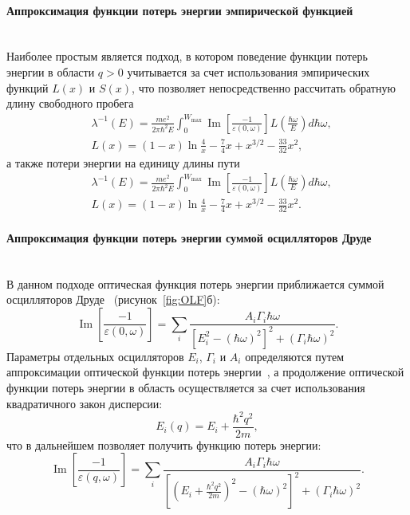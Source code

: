 \paragraph{Аппроксимация функции потерь энергии эмпирической функцией} \mbox{} \\
\indent Наиболее простым является подход, в котором поведение функции потерь энергии в области $q > 0$ учитывается за счет использования эмпирических функций $L(x)$ и $S(x)$, что позволяет непосредственно рассчитать обратную длину свободного пробега~\cite{Ashley_LxSx}
\begin{equation}
	\begin{aligned}
		&\lambda^{-1}(E)=\frac{m e^2}{2 \pi \hbar^2 E} \int_0^{W_{\max }} \operatorname{Im}\left[\frac{-1}{\varepsilon(0, \omega)}\right] L\left(\frac{\hbar \omega}{E}\right) d \hbar \omega, \\
		&L(x)=(1-x) \ln \frac{4}{x}-\frac{7}{4} x+x^{3 / 2}-\frac{33}{32} x^2,
	\end{aligned}
\end{equation}
а также потери энергии на единицу длины пути
\begin{equation}
	\begin{aligned}
		&\lambda^{-1}(E)=\frac{m e^2}{2 \pi \hbar^2 E} \int_0^{W_{\max }} \operatorname{Im}\left[\frac{-1}{\varepsilon(0, \omega)}\right] L\left(\frac{\hbar \omega}{E}\right) d \hbar \omega, \\
		&L(x)=(1-x) \ln \frac{4}{x}-\frac{7}{4} x+x^{3 / 2}-\frac{33}{32} x^2.
	\end{aligned}
\end{equation}



\paragraph{Аппроксимация функции потерь энергии суммой осцилляторов Друде} \mbox{} \\
\indent В данном подходе оптическая функция потерь энергии приближается суммой осцилляторов Друде~\cite{Ritchie_Drude} (рисунок~\ref{fig:OLF}б):
\begin{equation}
	\operatorname{Im}\left[\frac{-1}{\varepsilon(0, \omega)}\right]=\sum_i \frac{A_i \Gamma_i \hbar \omega}{\left[E_i^2-(\hbar \omega)^2\right]^2+\left(\Gamma_i \hbar \omega\right)^2}.
\end{equation}
Параметры отдельных осцилляторов $E_i$, $\Gamma_i$ и $A_i$ определяются путем аппроксимации оптической функции потерь энергии~\cite{Dapor_2015_oscillators}, а продолжение оптической функции потерь энергии в область осуществляется за счет использования квадратичного закон дисперсии:
\begin{equation}
	E_i(q)=E_i+\frac{\hbar^2 q^2}{2 m},
\end{equation}
что в дальнейшем позволяет получить функцию потерь энергии:
\begin{equation}
	\operatorname{Im}\left[\frac{-1}{\varepsilon(q, \omega)}\right]=\sum_i \frac{A_i \Gamma_i \hbar \omega}{\left[\left(E_i+\frac{\hbar^2 q^2}{2 m}\right)^2-(\hbar \omega)^2\right]^2+\left(\Gamma_i \hbar \omega\right)^2}.
\end{equation}

